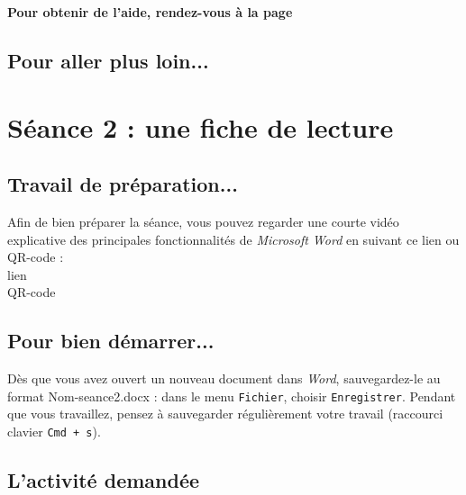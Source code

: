 \textbf{Pour obtenir de l'aide, rendez-vous à la page \pageref{aide_seancesWord3}}

\subsection{Pour aller plus loin...}

\vfill




%
%
%
%

\pagebreak

\section{Séance 2 : une fiche de lecture}\label{ficheTexte4e3}

\subsection{Travail de préparation...}

Afin de bien préparer la séance, vous pouvez regarder une courte vidéo explicative des principales fonctionnalités de \emph{Microsoft Word} en suivant ce lien ou QR-code :\\

lien\\
QR-code

\subsection{Pour bien démarrer...}

Dès que vous avez ouvert un nouveau document dans \emph{Word}, sauvegardez-le au format Nom-seance2.docx : dans le menu \texttt{Fichier}, choisir \texttt{Enregistrer}. Pendant que vous travaillez, pensez à sauvegarder régulièrement votre travail (raccourci clavier \texttt{Cmd + s}).   


\subsection{L'activité demandée}

\vspace{10pt}

